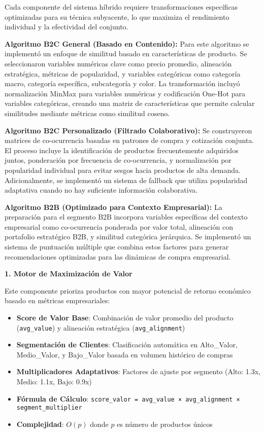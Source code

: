 \documentclass[twocolumn]{article}
\begin{document}
Cada componente del sistema híbrido requiere transformaciones específicas optimizadas para su técnica subyacente, lo que maximiza el rendimiento individual y la efectividad del conjunto.

\textbf{Algoritmo B2C General (Basado en Contenido):}
Para este algoritmo se implementó un enfoque de similitud basado en características de producto. Se seleccionaron variables numéricas clave como precio promedio, alineación estratégica, métricas de popularidad, y variables categóricas como categoría macro, categoría específica, subcategoría y color. La transformación incluyó normalización MinMax para variables numéricas y codificación One-Hot para variables categóricas, creando una matriz de características que permite calcular similitudes mediante métricas como similitud coseno.

\textbf{Algoritmo B2C Personalizado (Filtrado Colaborativo):}
Se construyeron matrices de co-ocurrencia basadas en patrones de compra y cotización conjunta. El proceso incluye la identificación de productos frecuentemente adquiridos juntos, ponderación por frecuencia de co-ocurrencia, y normalización por popularidad individual para evitar sesgos hacia productos de alta demanda. Adicionalmente, se implementó un sistema de fallback que utiliza popularidad adaptativa cuando no hay suficiente información colaborativa.

\textbf{Algoritmo B2B (Optimizado para Contexto Empresarial):}
La preparación para el segmento B2B incorpora variables específicas del contexto empresarial como co-ocurrencia ponderada por valor total, alineación con portafolio estratégico B2B, y similitud categórica jerárquica. Se implementó un sistema de puntuación múltiple que combina estos factores para generar recomendaciones optimizadas para las dinámicas de compra empresarial.

\textbf{1. Motor de Maximización de Valor}

Este componente prioriza productos con mayor potencial de retorno económico basado en métricas empresariales:

\begin{itemize}
    \item \textbf{Score de Valor Base}: Combinación de valor promedio del producto (\texttt{avg\_value}) y alineación estratégica (\texttt{avg\_alignment})
    \item \textbf{Segmentación de Clientes}: Clasificación automática en Alto\_Valor, Medio\_Valor, y Bajo\_Valor basada en volumen histórico de compras
    \item \textbf{Multiplicadores Adaptativos}: Factores de ajuste por segmento (Alto: 1.3x, Medio: 1.1x, Bajo: 0.9x)
    \item \textbf{Fórmula de Cálculo}: \texttt{score\_valor = avg\_value × avg\_alignment × segment\_multiplier}
    \item \textbf{Complejidad}: \(O(p)\) donde \(p\) es número de productos únicos
\end{itemize}
\end{document}
